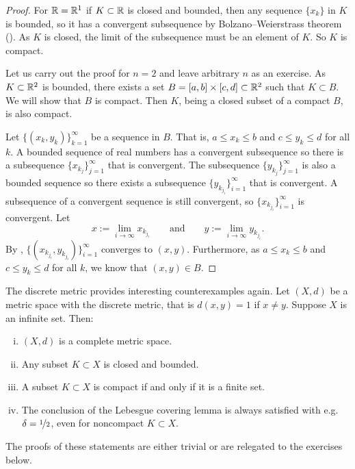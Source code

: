 \begin{proof}
For ${\mathbb{R}} = {\mathbb{R}}^1$ if $K \subset {\mathbb{R}}$ is closed and bounded, then
any sequence $\{ x_k \}$ in $K$ is bounded, so it has a convergent
subsequence by
Bolzano--Weierstrass theorem ().
As $K$ is closed, the limit of the subsequence must be an element of
$K$.  So $K$ is compact.

Let us carry out the proof for $n=2$ and leave arbitrary $n$ as an exercise.
As $K \subset {\mathbb{R}}^2$ is bounded, there exists a set
$B=[a,b]\times[c,d] \subset {\mathbb{R}}^2$ such that $K \subset B$.  We will show
that $B$ is compact.  Then $K$, being a closed subset of a compact $B$, is
also compact.  

Let $\{ (x_k,y_k) \}_{k=1}^\infty$ be a sequence in $B$.  That is,
$a \leq x_k \leq b$ and
$c \leq y_k \leq d$ for all $k$.  A bounded sequence of real numbers
has a convergent
subsequence so there is a subsequence $\{ x_{k_j} \}_{j=1}^\infty$
that is convergent.  The subsequence 
$\{ y_{k_j} \}_{j=1}^\infty$ is also a bounded sequence so there exists
a subsequence
$\{ y_{k_{j_i}} \}_{i=1}^\infty$ that is convergent.  A subsequence of a
convergent sequence is still convergent, so 
$\{ x_{k_{j_i}} \}_{i=1}^\infty$ is convergent.
Let
\begin{equation*}
x := \lim_{i\to\infty} x_{k_{j_i}}
\qquad \text{and} \qquad
y := \lim_{i\to\infty} y_{k_{j_i}} .
\end{equation*}
By ,
$\bigl\{ (x_{k_{j_i}},y_{k_{j_i}}) \bigr\}_{i=1}^\infty$ converges to $(x,y)$.
Furthermore, as $a \leq x_k \leq b$ and
$c \leq y_k \leq d$ for all $k$, we know that $(x,y) \in B$.
\end{proof}

\begin{example}
The discrete metric provides interesting counterexamples again.
Let $(X,d)$ be a metric space with the discrete metric, that is $d(x,y) = 1$
if $x \not= y$.  Suppose
$X$ is an infinite set.  Then:
\begin{enumerate}[(i)]
\item $(X,d)$ is a complete metric space.
\item Any subset $K \subset X$ is closed and bounded.
\item A subset $K \subset X$ is compact if and only if it is a finite set.
\item The conclusion of the Lebesgue covering lemma is always satisfied with
e.g. $\delta = \nicefrac{1}{2}$, even for noncompact $K \subset X$.
\end{enumerate}
The proofs
of these statements are either trivial or are relegated to the exercises
below.
\end{example}

